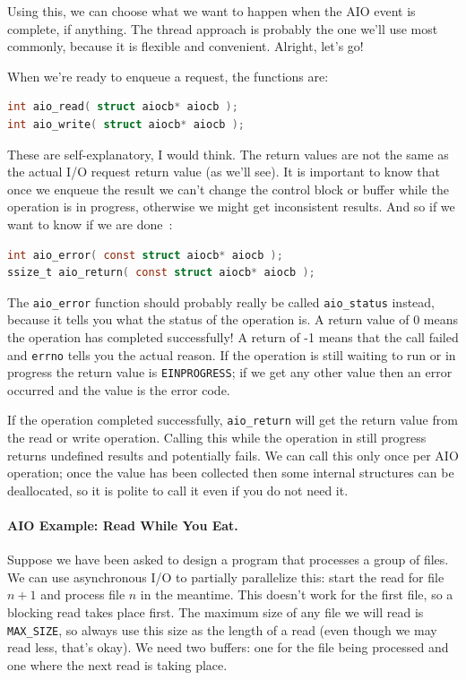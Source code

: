 \documentclass[a4paper]{report}
\begin{document}
Using this, we can choose what we want to happen when the AIO event is complete, if anything. The thread approach is probably the one we'll use most commonly, because it is flexible and convenient. Alright, let's go!

When we're ready to enqueue a request, the functions are:
\begin{lstlisting}[language=C]
int aio_read( struct aiocb* aiocb );
int aio_write( struct aiocb* aiocb );
\end{lstlisting}

These are self-explanatory, I would think. The return values are not the same as the actual I/O request return value (as we'll see). It is important to know that once we enqueue the result we can't change the control block or buffer while the operation is in progress, otherwise we might get inconsistent results. And so if we want to know if we are done~\cite{apunix}:

\begin{lstlisting}[language=C]
int aio_error( const struct aiocb* aiocb );
ssize_t aio_return( const struct aiocb* aiocb );
\end{lstlisting}

The \texttt{aio\_error} function should probably really be called \texttt{aio\_status} instead, because it tells you what the status of the operation is. A return value of 0 means the operation has completed successfully! A return of -1 means that the call failed and \texttt{errno} tells you the actual reason. If the operation is still waiting to run or in progress the return value is \texttt{EINPROGRESS}; if we get any other value then an error occurred and the value is the error code.

If the operation completed successfully, \texttt{aio\_return} will get the return value from the read or write operation. Calling this while the operation in still progress returns undefined results and potentially fails. We can call this only once per AIO operation; once the value has been collected then some internal structures can be deallocated, so it is polite to call it even if you do not need it.

\paragraph{AIO Example: Read While You Eat.}

Suppose we have been asked to design a program that processes a group of files. We can use asynchronous I/O to partially parallelize this: start the read for file $n+1$ and process file $n$ in the meantime. This doesn't work for the first file, so a blocking read takes place first. The maximum size of any file we will read is \texttt{MAX\_SIZE}, so always use this size as the length of a read (even though we may read less, that's okay). We need two buffers: one for the file being processed and one where the next read is taking place.
\end{document}
